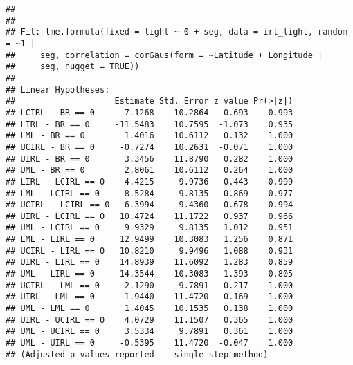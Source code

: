 \documentclass[letterpaper,12pt]{article}\usepackage[]{graphicx}\usepackage[]{color}
\makeatletter
\newenvironment{kframe}{%
 \def\at@end@of@kframe{}%
 \ifinner\ifhmode%
  \def\at@end@of@kframe{\end{minipage}}%
  \begin{minipage}{\columnwidth}%
 \fi\fi%
 \def\FrameCommand##1{\hskip\@totalleftmargin \hskip-\fboxsep
 \colorbox{shadecolor}{##1}\hskip-\fboxsep
     \hskip-\linewidth \hskip-\@totalleftmargin \hskip\columnwidth}%
 \MakeFramed {\advance\hsize-\width
   \@totalleftmargin\z@ \linewidth\hsize
   \@setminipage}}%
 {\par\unskip\endMakeFramed%
 \at@end@of@kframe}
\newenvironment{knitrout}{}{} %
\makeatother
\begin{document}
\begin{knitrout}
\begin{kframe}
\begin{verbatim}
## 
## 
## Fit: lme.formula(fixed = light ~ 0 + seg, data = irl_light, random = ~1 | 
##     seg, correlation = corGaus(form = ~Latitude + Longitude | 
##     seg, nugget = TRUE))
## 
## Linear Hypotheses:
##                    Estimate Std. Error z value Pr(>|z|)
## LCIRL - BR == 0     -7.1268    10.2864  -0.693    0.993
## LIRL - BR == 0     -11.5483    10.7595  -1.073    0.935
## LML - BR == 0        1.4016    10.6112   0.132    1.000
## UCIRL - BR == 0     -0.7274    10.2631  -0.071    1.000
## UIRL - BR == 0       3.3456    11.8790   0.282    1.000
## UML - BR == 0        2.8061    10.6112   0.264    1.000
## LIRL - LCIRL == 0   -4.4215     9.9736  -0.443    0.999
## LML - LCIRL == 0     8.5284     9.8135   0.869    0.977
## UCIRL - LCIRL == 0   6.3994     9.4360   0.678    0.994
## UIRL - LCIRL == 0   10.4724    11.1722   0.937    0.966
## UML - LCIRL == 0     9.9329     9.8135   1.012    0.951
## LML - LIRL == 0     12.9499    10.3083   1.256    0.871
## UCIRL - LIRL == 0   10.8210     9.9496   1.088    0.931
## UIRL - LIRL == 0    14.8939    11.6092   1.283    0.859
## UML - LIRL == 0     14.3544    10.3083   1.393    0.805
## UCIRL - LML == 0    -2.1290     9.7891  -0.217    1.000
## UIRL - LML == 0      1.9440    11.4720   0.169    1.000
## UML - LML == 0       1.4045    10.1535   0.138    1.000
## UIRL - UCIRL == 0    4.0729    11.1507   0.365    1.000
## UML - UCIRL == 0     3.5334     9.7891   0.361    1.000
## UML - UIRL == 0     -0.5395    11.4720  -0.047    1.000
## (Adjusted p values reported -- single-step method)
\end{verbatim}
\end{kframe}
\end{knitrout}
\end{document}
